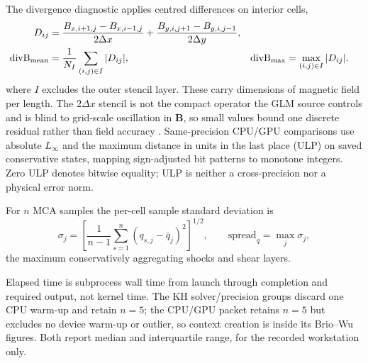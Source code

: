 The divergence diagnostic applies centred differences on interior cells,
\begin{align}
 D_{ij} &=\frac{B_{x,i+1,j}-B_{x,i-1,j}}{2\Delta x}
          +\frac{B_{y,i,j+1}-B_{y,i,j-1}}{2\Delta y}, \notag\\
 \mathrm{divB}_{\mathrm{mean}}
        &=\frac{1}{N_I}\sum_{(i,j)\in I}|D_{ij}|,
 &\mathrm{divB}_{\max}
        &=\max_{(i,j)\in I}|D_{ij}|.
 \label{eq:ch3-divb}
\end{align}
where $I$ excludes the outer stencil layer. These carry dimensions of magnetic
field per length. The $2\Delta x$ stencil is not the compact operator the GLM
source controls and is blind to grid-scale oscillation in $\mathbf B$, so small
values bound one discrete residual rather than field accuracy
\citep{toth_2000}. Same-precision CPU/GPU comparisons use absolute $L_\infty$
and the maximum distance in units in the last place (ULP) on saved conservative
states, mapping sign-adjusted bit patterns to monotone integers. Zero ULP
denotes bitwise equality; ULP is neither a cross-precision nor a physical error
norm.

For $n$ MCA samples the per-cell sample standard deviation is
\begin{equation}
 \sigma_j=\left[\frac{1}{n-1}\sum_{s=1}^{n}
 (q_{s,j}-\bar q_j)^2\right]^{1/2},\qquad
 \mathrm{spread}_q=\max_j\sigma_j ,
 \label{eq:ch3-mca-spread}
\end{equation}
the maximum conservatively aggregating shocks and shear layers.

Elapsed time is subprocess wall time from launch through completion and
required output, not kernel time. The KH solver/precision groups discard one
CPU warm-up and retain $n=5$; the CPU/GPU packet retains $n=5$ but excludes no
device warm-up or outlier, so context creation is inside its Brio--Wu figures.
Both report median and interquartile range, for the recorded workstation only.

